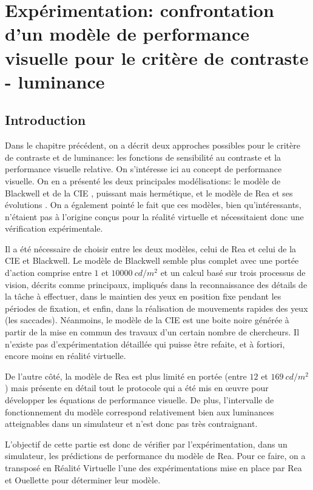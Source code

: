 \part{Expérimentation: confrontation d'un modèle de performance visuelle pour le critère de contraste - luminance}

\chapter*{Introduction}
\par Dans le chapitre précédent, on a décrit deux approches possibles pour le critère de contraste et de luminance: les fonctions de sensibilité au contraste et la performance visuelle relative. On s'intéresse ici au concept de performance visuelle. On en a présenté les deux principales modélisations: le modèle de Blackwell et de la CIE \citep{blackwell_ieri:_1971}, puissant mais hermétique, et le modèle de Rea et ses évolutions \citep{rea_toward_1986}. On a également pointé le fait que ces modèles, bien qu'intéressants, n'étaient pas à l'origine conçus pour la réalité virtuelle et nécessitaient donc une vérification expérimentale.

\par Il a été nécessaire de choisir entre les deux modèles, celui de Rea et celui de la CIE et Blackwell. Le modèle de Blackwell semble plus complet avec une portée d'action comprise entre $1$ et $10000~cd/m^2$ et un calcul basé sur trois processus de vision, décrits comme principaux, impliqués dans la reconnaissance des détails de la tâche à effectuer, dans le maintien des yeux en position fixe pendant les périodes de fixation, et enfin, dans la réalisation de mouvements rapides des yeux (les saccades). Néanmoins, le modèle de la CIE est une boite noire générée à partir de la mise en commun des travaux d'un certain nombre de chercheurs. Il n'existe pas d'expérimentation détaillée qui puisse être refaite, et à fortiori, encore moins en réalité virtuelle.

\par De l'autre côté, la modèle de Rea est plus limité en portée (entre $12$ et $169~cd/m^2$) mais présente en détail tout le protocole qui a été mis en œuvre pour développer les équations de performance visuelle. De plus, l'intervalle de fonctionnement du modèle correspond relativement bien aux luminances atteignables dans un simulateur et n'est donc pas très contraignant.

\par L'objectif de cette partie est donc de vérifier par l'expérimentation, dans un simulateur, les prédictions de performance du modèle de Rea. Pour ce faire, on a transposé en Réalité Virtuelle l'une des expérimentations mise en place par Rea et Ouellette pour déterminer leur modèle.
